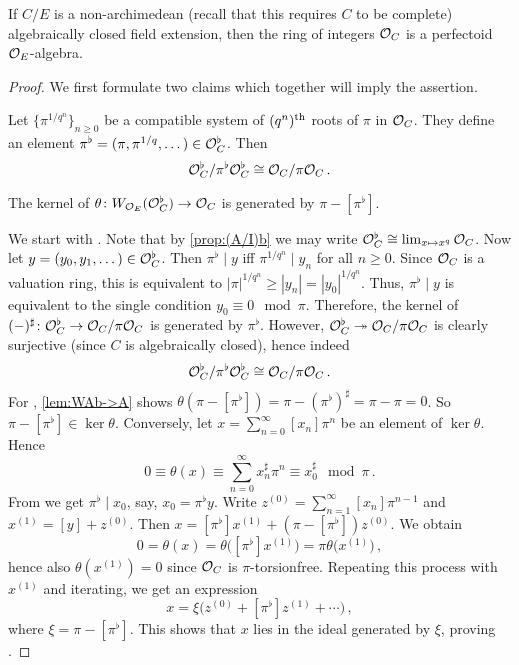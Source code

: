 \documentclass[a4paper, 10pt, oneside, DIV=9, chapterprefix=true, numbers=enddot,bibliography=totoc]{scrbook}
\DeclareRobustCommand{\Attention}{\tikz[baseline, anchor=base]\node[draw, regular polygon, regular polygon sides=3, rounded corners=2, thick, inner sep=-0.25pt] at (0,0) {\textbf{!}};}
\begin{document}
\numpar{Example \smash{\Attention}}\label{exm:OCperfectoid}
If $C/E$ is a non-archimedean (recall that this requires $C$ to be complete) algebraically closed field extension, then the ring of integers $\mathcal{O}_C$ is a perfectoid $\mathcal{O}_E$-algebra.
\begin{proof}
	We first formulate two claims which together will imply the assertion.
	\begin{numerate}
		\item Let $\{\pi^{1/q^n}\}_{n\geq 0}$ be a compatible system of $(q^n)^{\text{th}}$ roots of $\pi$ in $\mathcal{O}_C$. They define an element $\pi^\flat=(\pi,\pi^{1/q},\dotsc)\in\mathcal{O}_C^\flat$. Then 
		\begin{equation*}
			\mathcal{O}_C^\flat/\pi^\flat\mathcal{O}_C^\flat\cong\mathcal{O}_C/\pi\mathcal{O}_C\,.
		\end{equation*}
		\item The kernel of $\theta\colon W_{\Oo_E}(\Oo_C^\flat)\morphism\Oo_C$ is generated by $\pi-[\pi^\flat]$.
	\end{numerate}
	We start with . Note that by \cref{prop:(A/I)b} we may write $\mathcal{O}_C^\flat\cong \lim_{x\mapsto x^q}\mathcal{O}_C$. Now let $y=(y_0,y_1,\dotsc)\in\mathcal{O}_C^\flat$. Then $\pi^\flat\mid y$ iff $\pi^{1/q^n}\mid y_n$ for all $n\geq 0$. Since $\mathcal{O}_C$ is a valuation ring, this is equivalent to $|\pi|^{1/q^n}\geq |y_n|=|y_0|^{1/q^n}$. Thus, $\pi^\flat\mid y$ is equivalent to the single condition $y_0\equiv 0\mod \pi$. Therefore, the kernel of $(-)^\sharp\colon \Oo_C^\flat\morphism \Oo_C/\pi\Oo_C$ is generated by $\pi^\flat$. However, $\Oo_C^\flat\epimorphism \Oo_C/\pi\Oo_C$ is clearly surjective (since $C$ is algebraically closed), hence indeed
	\begin{equation*}
		\mathcal{O}_C^\flat/\pi^\flat\mathcal{O}_C^\flat\cong \mathcal{O}_C/\pi\mathcal{O}_C\,.
	\end{equation*}
	For , \cref{lem:WAb->A} shows $\theta(\pi-[\pi^\flat])=\pi-(\pi^\flat)^\sharp=\pi-\pi=0$. So $\pi-[\pi^\flat]\in\ker\theta$. Conversely, let $x=\sum_{n=0}^\infty[x_n]\pi^n$ be an element of $\ker\theta$. Hence
	\begin{equation*}
		0\equiv \theta(x)\equiv \sum_{n=0}^\infty x_n^\sharp\pi^n\equiv x_0^\sharp\mod \pi\,.
	\end{equation*}
	From  we get $\pi^\flat\mid x_0$, say, $x_0=\pi^\flat y$. Write $z^{(0)}=\sum_{n=1}^\infty [x_n]\pi^{n-1}$ and $x^{(1)}=[y]+z^{(0)}$. Then $x=[\pi^\flat]x^{(1)}+(\pi-[\pi^\flat])z^{(0)}$. We obtain
	\begin{equation*}
		0=\theta(x)=\theta\big([\pi^\flat]x^{(1)}\big)=\pi\theta\big(x^{(1)}\big)\,,
	\end{equation*}
	hence also $\theta(x^{(1)})=0$ since $\mathcal{O}_C$ is $\pi$-torsionfree. Repeating this process with $x^{(1)}$ and iterating, we get an expression
	\begin{equation*}
		x=\xi\big(z^{(0)}+[\pi^\flat]z^{(1)}+\dotsb\big)\,,
	\end{equation*}
	where $\xi=\pi-[\pi^\flat]$. This shows that $x$ lies in the ideal generated by $\xi$, proving .
	

\end{proof}
\end{document}
